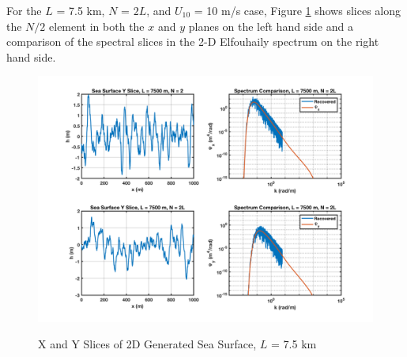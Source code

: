 For the $L$ = 7.5 km, $N$ = $2L$, and $U_{10}$ = 10 m/s case, Figure \ref{os_fig:12a} shows slices along the $N/2$ element in both the $x$ and $y$ planes on the left hand side and a comparison of the spectral slices in the 2-D Elfouhaily spectrum on the right hand side.
\begin{figure}[H]
  \begin{center}
\includegraphics[width=6in]{../media/Ocean_Surface/sea_surface_2d_slices_7500.png}
  \end{center}
  \renewcommand{\baselinestretch}{1} \small\normalsize
  \begin{quote}
    \caption[X and Y Slices of 2D Generated Sea Surface, $L$ = 7.5 km]{X and Y Slices of 2D Generated Sea Surface, $L$ = 7.5 km\label{os_fig:12a}}
  \end{quote}
\end{figure}
\renewcommand{\baselinestretch}{2} \small\normalsize